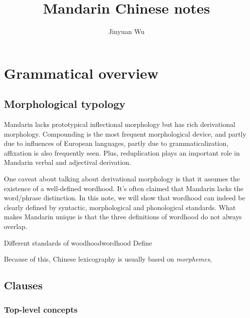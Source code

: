 \documentclass[UTF8, a4paper, oneside, scheme=plain, 12pt]{ctexrep}
\title{Mandarin Chinese notes}
\author{Jinyuan Wu}
\begin{document}
\automath

\maketitle

\chapter{Grammatical overview}

\section{Morphological typology}

Mandarin lacks prototypical inflectional morphology but has rich derivational morphology.
Compounding is the most frequent morphological device,
and partly due to influences of European languages, partly due to grammaticalization,
affixation is also frequently seen.
Plus, reduplication plays an important role in Mandarin verbal and adjectival derivation.

One caveat about talking about derivational morphology is that it assumes
the existence of a well-defined wordhood.
It's often claimed that Mandarin lacks the word/phrase distinction.
In this note, we will show that wordhood can indeed be clearly defined 
by syntactic, morphological and phonological standards.
What makes Mandarin unique is that the three definitions of wordhood do not always overlap.

\begin{todobox}{Different standards of woodhood}{wordhood}
    Define
\end{todobox}

Because of this, Chinese lexicography is usually based on \emph{morphemes},

\section{Clauses}

\subsection{Top-level concepts}
\end{document}
